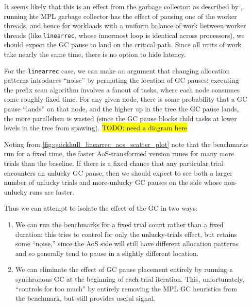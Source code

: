 It seems likely that this is an effect from the garbage collector: as described
by \citet{mpl-orig}, running hte MPL garbage collector has the effect of pausing
one of the worker threads, and hence for workloads with a uniform balance of
work between worker threads (like \texttt{linearrec}, whose innermost loop is
identical across processors), we should expect the GC pause to land on the
critical path. Since all units of work take nearly the same time, there is no
option to hide latency.

For the \texttt{linearrec} case, we can make an argument that changing
allocation patterns introduces ``noise'' by permuting the location of GC pauses:
executing the prefix scan algorithm involves a fanout of tasks, where each node
consumes some roughly-fixed time. For any given node, there is some probability
that a GC pause ``lands'' on that node, and the higher up in the tree the GC
pause lands, the more parallelism is wasted (since the GC pause blocks child
tasks at lower levels in the tree from spawing). \hl{TODO: need a diagram here}

Noting from \cref{fig:quickhull_linearrec_aos_scatter_plot} note that the
benchmarks run for a fixed time, the faster AoS-transformed version runes for
many more trials than the baseline. If there is a fixed chance that any
particular trial encounters an unlucky GC pause, then we should expect to see
both a larger number of unlucky trials and more-unlucky GC pauses on the side
whose non-unlucky runs are faster.

Thus we can attempt to isolate the effect of the GC in two ways:
\begin{enumerate}
\item We can run the benchmarks for a fixed trial count rather than a fixed
  duration: this tries to control for only the unlucky-trials effect, but
  retains some ``noise,'' since the AoS side will still have different
  allocation patterns and so generally tend to pause in a slightly different
  location.

\item We can eliminate the effect of GC pause placement entirely by running a
  synchronous GC at the beginning of each trial iteration. This, unfortunately,
  ``controls for too much'' by entirely removing the MPL GC heuristics from the
  benchmark, but still provides useful signal.
\end{enumerate}

